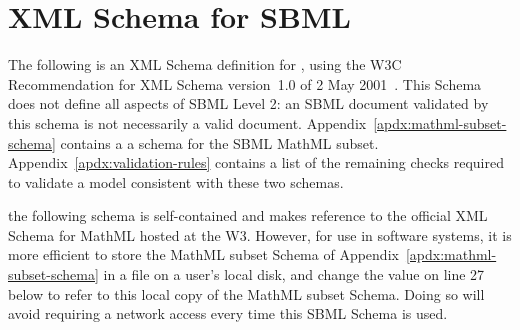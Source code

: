 
\section{XML Schema for SBML}
\label{apdx:schema}

The following is an XML Schema definition for \sbmltwotwo, using
the W3C Recommendation for XML Schema version~1.0 of 2 May
2001~\citep{biron:2000,fallside:2000,thompson:2000}.  This Schema
does not define all aspects of SBML Level 2: an SBML document
validated by this schema is not necessarily a valid \sbmltwo
document.  Appendix~\ref{apdx:mathml-subset-schema} contains a a
schema for the SBML MathML subset.
Appendix~\ref{apdx:validation-rules} contains a list of the
remaining checks required to validate a model  consistent with these two schemas.

 the following schema is
self-contained and makes reference to the official XML Schema for
MathML hosted at the W3.  However, for use in software systems, it
is more efficient to store the MathML subset Schema of
Appendix~\ref{apdx:mathml-subset-schema} in a file on a user's
local disk, and change the  value on line 27
below to refer to this local copy of the MathML subset Schema.
Doing so will avoid requiring a network access every time this
SBML Schema is used.

\begin{blockChanged}

\begin{example}
\begin{footnotesize}

\end{footnotesize}
\end{example}

\end{blockChanged}
